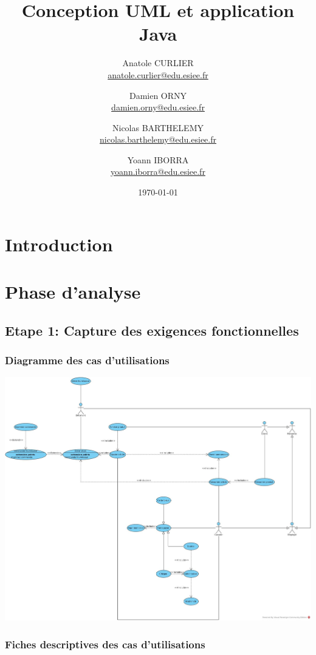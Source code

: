 \documentclass[a4paper,table]{article}
\title{Conception UML  et application Java}
\author{
	Anatole CURLIER \\ \href{mailto:anatole.curlier@edu.esiee.fr}{anatole.curlier@edu.esiee.fr} \and
	Damien ORNY \\ \href{mailto:damien.orny@edu.esiee.fr}{damien.orny@edu.esiee.fr} \and
	Nicolas BARTHELEMY \\ \href{mailto:nicolas.barthelemy@edu.esiee.fr}{nicolas.barthelemy@edu.esiee.fr} \and
	Yoann IBORRA \\ \href{mailto:yoann.iborra@edu.esiee.fr} {yoann.iborra@edu.esiee.fr}
}
\date{\today}
\begin{document}
\maketitle
\newpage
\tableofcontents
\newpage

\section*{Introduction}

\newpage

\section{Phase d'analyse}

\subsection{Etape 1: Capture des exigences fonctionnelles}

\subsubsection{Diagramme des cas d'utilisations}

\includegraphics[width=\textwidth]{images/Use_Case.jpg}

\subsubsection{Fiches descriptives des cas d'utilisations}
\end{document}
